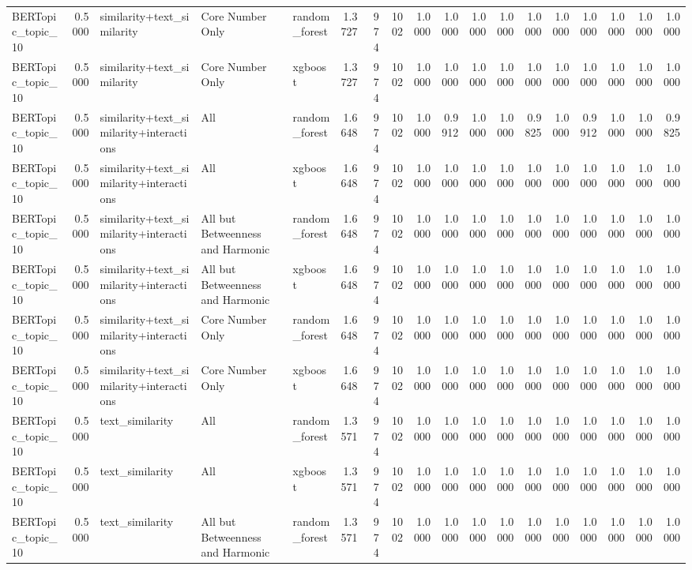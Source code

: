 \begin{tabular}{lrlllrrrrrrrrrrrrr}
BERTopic_topic_10 & 0.5000 & similarity+text_similarity & Core Number Only & random_forest & 1.3727 & 974 & 1002 & 1.0000 & 1.0000 & 1.0000 & 1.0000 & 1.0000 & 1.0000 & 1.0000 & 1.0000 & 1.0000 & 1.0000 \\
BERTopic_topic_10 & 0.5000 & similarity+text_similarity & Core Number Only & xgboost & 1.3727 & 974 & 1002 & 1.0000 & 1.0000 & 1.0000 & 1.0000 & 1.0000 & 1.0000 & 1.0000 & 1.0000 & 1.0000 & 1.0000 \\
BERTopic_topic_10 & 0.5000 & similarity+text_similarity+interactions & All & random_forest & 1.6648 & 974 & 1002 & 1.0000 & 0.9912 & 1.0000 & 1.0000 & 0.9825 & 1.0000 & 0.9912 & 1.0000 & 1.0000 & 0.9825 \\
BERTopic_topic_10 & 0.5000 & similarity+text_similarity+interactions & All & xgboost & 1.6648 & 974 & 1002 & 1.0000 & 1.0000 & 1.0000 & 1.0000 & 1.0000 & 1.0000 & 1.0000 & 1.0000 & 1.0000 & 1.0000 \\
BERTopic_topic_10 & 0.5000 & similarity+text_similarity+interactions & All but Betweenness and Harmonic & random_forest & 1.6648 & 974 & 1002 & 1.0000 & 1.0000 & 1.0000 & 1.0000 & 1.0000 & 1.0000 & 1.0000 & 1.0000 & 1.0000 & 1.0000 \\
BERTopic_topic_10 & 0.5000 & similarity+text_similarity+interactions & All but Betweenness and Harmonic & xgboost & 1.6648 & 974 & 1002 & 1.0000 & 1.0000 & 1.0000 & 1.0000 & 1.0000 & 1.0000 & 1.0000 & 1.0000 & 1.0000 & 1.0000 \\
BERTopic_topic_10 & 0.5000 & similarity+text_similarity+interactions & Core Number Only & random_forest & 1.6648 & 974 & 1002 & 1.0000 & 1.0000 & 1.0000 & 1.0000 & 1.0000 & 1.0000 & 1.0000 & 1.0000 & 1.0000 & 1.0000 \\
BERTopic_topic_10 & 0.5000 & similarity+text_similarity+interactions & Core Number Only & xgboost & 1.6648 & 974 & 1002 & 1.0000 & 1.0000 & 1.0000 & 1.0000 & 1.0000 & 1.0000 & 1.0000 & 1.0000 & 1.0000 & 1.0000 \\
BERTopic_topic_10 & 0.5000 & text_similarity & All & random_forest & 1.3571 & 974 & 1002 & 1.0000 & 1.0000 & 1.0000 & 1.0000 & 1.0000 & 1.0000 & 1.0000 & 1.0000 & 1.0000 & 1.0000 \\
BERTopic_topic_10 & 0.5000 & text_similarity & All & xgboost & 1.3571 & 974 & 1002 & 1.0000 & 1.0000 & 1.0000 & 1.0000 & 1.0000 & 1.0000 & 1.0000 & 1.0000 & 1.0000 & 1.0000 \\
BERTopic_topic_10 & 0.5000 & text_similarity & All but Betweenness and Harmonic & random_forest & 1.3571 & 974 & 1002 & 1.0000 & 1.0000 & 1.0000 & 1.0000 & 1.0000 & 1.0000 & 1.0000 & 1.0000 & 1.0000 & 1.0000 \\

\end{tabular}
